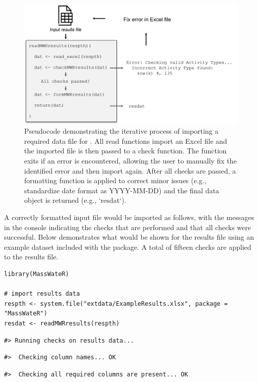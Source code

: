 \begin{figure}
\includegraphics[width=1\linewidth]{figs/importflow} \caption{Pseudocode demonstrating the iterative process of importing a required data file for .  All read functions import an Excel file and the imported file is then passed to a check function.  The function exits if an error is encountered, allowing the user to manually fix the identified error and then import again.  After all checks are passed, a formatting function is applied to correct minor issues (e.g., standardize date format as YYYY-MM-DD) and the final data object is returned (e.g., `resdat`).}\label{fig:importflow}
\end{figure}

A correctly formatted input file would be imported as follows, with the messages in the console indicating the checks that are performed and that all checks were successful. Below demonstrates what would be shown for the results file using an example dataset included with the package. A total of fifteen checks are applied to the results file.

\begin{verbatim}
library(MassWateR)

# import results data
respth <- system.file("extdata/ExampleResults.xlsx", package = "MassWateR")
resdat <- readMWRresults(respth)
\end{verbatim}

\begin{verbatim}
#> Running checks on results data...
\end{verbatim}

\begin{verbatim}
#>  Checking column names... OK
\end{verbatim}

\begin{verbatim}
#>  Checking all required columns are present... OK
\end{verbatim}

